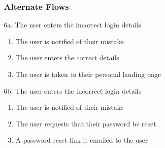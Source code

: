 \documentclass[12pt,onecolumn]{article}
\begin{document}
	\subsubsection{Alternate Flows}
	
	6a. The user enters the incorrect login details
	
	\begin{enumerate}
		\item The user is notified of their mistake
		
		\item The user enters the correct details
		
		\item The user is taken to their personal landing page
	\end{enumerate}
	
	\hspace{-0.8cm} 6b. The user enters the incorrect login details
	
	\begin{enumerate}
		\item The user is notified of their mistake
		
		\item The user requests that their password be reset
		
		\item A password reset link it emailed to the user
	\end{enumerate}
	
	
	
	
	
\end{document}
